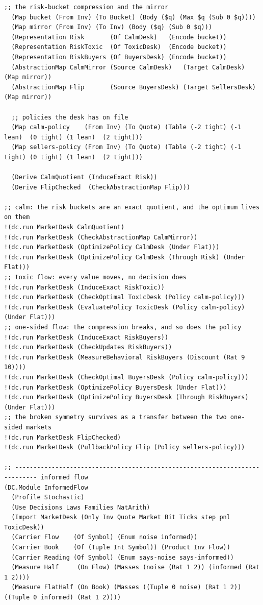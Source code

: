 \documentclass[11pt]{article}
\theoremstyle{definition}
\theoremstyle{plain}
\begin{document}
\begin{lstlisting}[style=mettafull]
  ;; the risk-bucket compression and the mirror
  (Map bucket (From Inv) (To Bucket) (Body ($q) (Max $q (Sub 0 $q))))
  (Map mirror (From Inv) (To Inv) (Body ($q) (Sub 0 $q)))
  (Representation Risk       (Of CalmDesk)   (Encode bucket))
  (Representation RiskToxic  (Of ToxicDesk)  (Encode bucket))
  (Representation RiskBuyers (Of BuyersDesk) (Encode bucket))
  (AbstractionMap CalmMirror (Source CalmDesk)   (Target CalmDesk)    (Map mirror))
  (AbstractionMap Flip       (Source BuyersDesk) (Target SellersDesk) (Map mirror))

  ;; policies the desk has on file
  (Map calm-policy    (From Inv) (To Quote) (Table (-2 tight) (-1 lean)  (0 tight) (1 lean)  (2 tight)))
  (Map sellers-policy (From Inv) (To Quote) (Table (-2 tight) (-1 tight) (0 tight) (1 lean)  (2 tight)))

  (Derive CalmQuotient (InduceExact Risk))
  (Derive FlipChecked  (CheckAbstractionMap Flip)))

;; calm: the risk buckets are an exact quotient, and the optimum lives on them
!(dc.run MarketDesk CalmQuotient)
!(dc.run MarketDesk (CheckAbstractionMap CalmMirror))
!(dc.run MarketDesk (OptimizePolicy CalmDesk (Under Flat)))
!(dc.run MarketDesk (OptimizePolicy CalmDesk (Through Risk) (Under Flat)))
;; toxic flow: every value moves, no decision does
!(dc.run MarketDesk (InduceExact RiskToxic))
!(dc.run MarketDesk (CheckOptimal ToxicDesk (Policy calm-policy)))
!(dc.run MarketDesk (EvaluatePolicy ToxicDesk (Policy calm-policy) (Under Flat)))
;; one-sided flow: the compression breaks, and so does the policy
!(dc.run MarketDesk (InduceExact RiskBuyers))
!(dc.run MarketDesk (CheckUpdates RiskBuyers))
!(dc.run MarketDesk (MeasureBehavioral RiskBuyers (Discount (Rat 9 10))))
!(dc.run MarketDesk (CheckOptimal BuyersDesk (Policy calm-policy)))
!(dc.run MarketDesk (OptimizePolicy BuyersDesk (Under Flat)))
!(dc.run MarketDesk (OptimizePolicy BuyersDesk (Through RiskBuyers) (Under Flat)))
;; the broken symmetry survives as a transfer between the two one-sided markets
!(dc.run MarketDesk FlipChecked)
!(dc.run MarketDesk (PullbackPolicy Flip (Policy sellers-policy)))

;; ---------------------------------------------------------------------------- informed flow
(DC.Module InformedFlow
  (Profile Stochastic)
  (Use Decisions Laws Families NatArith)
  (Import MarketDesk (Only Inv Quote Market Bit Ticks step pnl ToxicDesk))
  (Carrier Flow    (Of Symbol) (Enum noise informed))
  (Carrier Book    (Of (Tuple Int Symbol)) (Product Inv Flow))
  (Carrier Reading (Of Symbol) (Enum says-noise says-informed))
  (Measure Half     (On Flow) (Masses (noise (Rat 1 2)) (informed (Rat 1 2))))
  (Measure FlatHalf (On Book) (Masses ((Tuple 0 noise) (Rat 1 2)) ((Tuple 0 informed) (Rat 1 2))))


\end{lstlisting}
\end{document}
